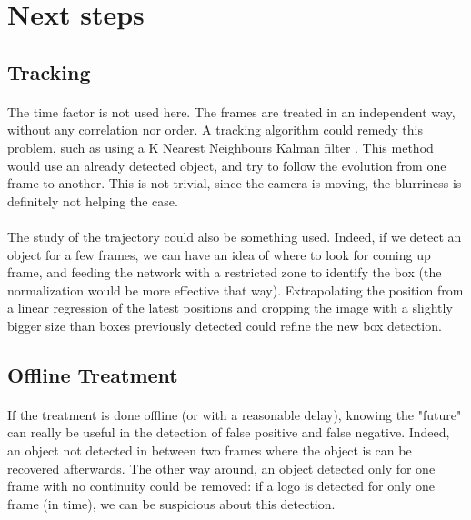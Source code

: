 \documentclass[12pt]{article}%
\begin{document}
\section{Next steps}\label{next-steps}

\subsection{Tracking}

\paragraph{}
The time factor is not used here. The frames are treated in an independent way, without any correlation nor order. A tracking algorithm could remedy this problem, such as using a K Nearest Neighbours Kalman ﬁlter \cite{kalman}. This method would use an already detected object, and try to follow the evolution from one frame to another. This is not trivial, since the camera is moving, the blurriness is definitely not helping the case.

\paragraph{}
The study of the trajectory could also be something used. Indeed, if we detect an object for a few frames, we can have an idea of where to look for coming up frame, and feeding the network with a restricted zone to identify the box (the normalization would be more effective that way). Extrapolating the position from a linear regression of the latest positions and cropping the image with a slightly bigger size than boxes previously detected could refine the new box detection.

\subsection{Offline Treatment}
\paragraph{}
If the treatment is done offline (or with a reasonable delay), knowing the "future" can really be useful in the detection of false positive and false negative. Indeed, an object not detected in between two frames where the object is can be recovered afterwards. The other way around, an object detected only for one frame with no continuity could be removed: if a logo is detected for only one frame (in time), we can be suspicious about this detection.
\end{document}
